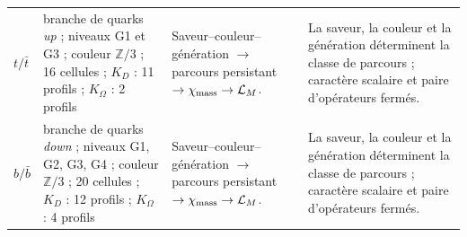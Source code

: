 \begin{longtable}{@{}>{\raggedright\arraybackslash}p{}>{\raggedright\arraybackslash}p{}>{\raggedright\arraybackslash}p{}>{\raggedright\arraybackslash}p{}@{}}
$t/\bar t$ & branche de quarks \emph{up} ; niveaux G1 et G3 ; couleur $\mathbb Z/3$ ; 16 cellules ; $K_D$ : 11 profils ; $K_\Omega$ : 2 profils & Saveur--couleur--génération $\to$ parcours persistant $\to\chi_{\rm mass}\to\mathcal L_M$. & La saveur, la couleur et la génération déterminent la classe de parcours ; caractère scalaire et paire d’opérateurs fermés. \\
$b/\bar b$ & branche de quarks \emph{down} ; niveaux G1, G2, G3, G4 ; couleur $\mathbb Z/3$ ; 20 cellules ; $K_D$ : 12 profils ; $K_\Omega$ : 4 profils & Saveur--couleur--génération $\to$ parcours persistant $\to\chi_{\rm mass}\to\mathcal L_M$. & La saveur, la couleur et la génération déterminent la classe de parcours ; caractère scalaire et paire d’opérateurs fermés. \\
\end{longtable}
\endgroup
